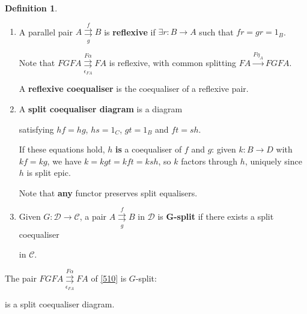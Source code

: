 \documentclass[a4paper]{article}
\theoremstyle{definition}
\newtheorem{definition}{Definition}
\theoremstyle{remark}
\theoremstyle{default}
\numberwithin{definition}{section}
\newcommand*\parallelpair[2]{\overset{#1}{\underset{#2}{\rightrightarrows}}}
\begin{document}
\begin{definition}
	\begin{enumerate}[label=\alph*.]
		\item A parallel pair $A \overset{f}{\underset{g}{\rightrightarrows}} B$ is \textbf{reflexive}
		if $\exists r: B \to A$ such that $fr = gr = 1_B$.
		
		Note that $FGFA \parallelpair{F\alpha}{\epsilon_{FA}} FA$ is reflexive,
		with common splitting $FA \overset{F\eta_A}{\to} FGFA$.
		
		A \textbf{reflexive coequaliser} is the coequaliser of a reflexive pair.
		
		\item A \textbf{split coequaliser diagram} is a diagram
		\begin{center}
		\end{center}
		satisfying $hf=hg$, $hs=1_C$, $gt = 1_B$ and $ft = sh$.
		
		If these equations hold, $h$ \textbf{is} a coequaliser of $f$ and $g$:
		given $k: B \to D$ with $kf = kg$, we have $k=kgt=kft=ksh$,
		so $k$ factors through $h$, uniquely since $h$ is split epic.
		
		Note that \textbf{any} functor preserves split equalisers.
		
		\item Given $G: \mathcal{D} \to \mathcal{C}$,
		a pair $A \parallelpair{f}{g} B$ in $\mathcal{D}$ is \textbf{G-split}
		if there exists a split coequaliser
		\begin{center}
		\end{center}
		in $\mathcal{C}$.
	\end{enumerate}
\end{definition}

The pair $FGFA \overset{F\alpha}{\underset{\epsilon_{FA}}{\rightrightarrows}} FA$ of \ref{510} is $G$-split:
\begin{center}
\end{center}
is a split coequaliser diagram.
\end{document}
